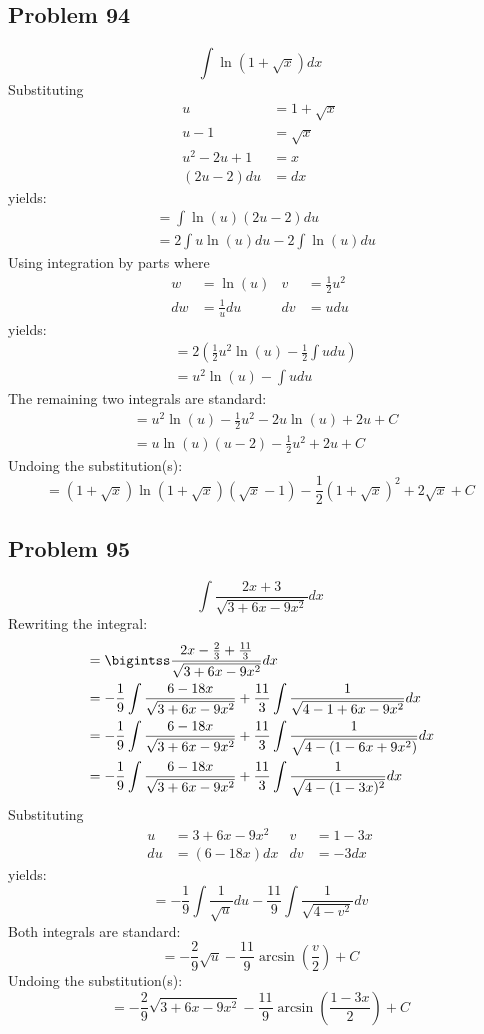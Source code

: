 \documentclass{article}
\begin{document}
\subsection*{Problem 94}
$$\int\ln\left(1+\sqrt{x}\right)dx$$
Substituting
\begin{align*}
u&=1+\sqrt{x} \\
u-1&=\sqrt{x} \\
u^2-2u+1&=x \\
(2u-2)du&=dx
\end{align*}
yields:
\begin{align*}
&=\int\ln(u)(2u-2)du \\
&=2\int u\ln(u)du-2\int\ln(u)du
\end{align*}
Using integration by parts where
\begin{align*}
w&=\ln(u) &v&=\frac{1}{2}u^2 \\
dw&=\frac{1}{u}du &dv&=udu
\end{align*}
yields:
\begin{align*}
&=2\left(\frac{1}{2}u^2\ln(u)-\frac{1}{2}\int udu\right) \\
&=u^2\ln(u)-\int udu
\end{align*}
The remaining two integrals are standard:
\begin{align*}
&=u^2\ln(u)-\frac{1}{2}u^2-2u\ln(u)+2u+C \\
&=u\ln(u)\left(u-2\right)-\frac{1}{2}u^2+2u+C
\end{align*}
Undoing the substitution(s):
$$=\left(1+\sqrt{x}\right)\ln\left(1+\sqrt{x}\right)\left(\sqrt{x}-1\right)-\frac{1}{2}\left(1+\sqrt{x}\right)^2+2\sqrt{x}+C$$
\subsection*{Problem 95}
$$\int\frac{2x+3}{\sqrt{3+6x-9x^2}}dx$$
Rewriting the integral:
\begin{align*}
&=\bigintss\frac{2x-\frac{2}{3}+\frac{11}{3}}{\sqrt{3+6x-9x^2}}dx \\
&=-\frac{1}{9}\int\frac{6-18x}{\sqrt{3+6x-9x^2}}+\frac{11}{3}\int\frac{1}{\sqrt{4-1+6x-9x^2}}dx \\
&=-\frac{1}{9}\int\frac{6-18x}{\sqrt{3+6x-9x^2}}+\frac{11}{3}\int\frac{1}{\sqrt{4-(1-6x+9x^2)}}dx \\
&=-\frac{1}{9}\int\frac{6-18x}{\sqrt{3+6x-9x^2}}+\frac{11}{3}\int\frac{1}{\sqrt{4-(1-3x)^2}}dx
\end{align*}
Substituting
\begin{align*}
u&=3+6x-9x^2 &v&=1-3x \\
du&=(6-18x)dx &dv&=-3dx
\end{align*}
yields:
$$=-\frac{1}{9}\int\frac{1}{\sqrt{u}}du-\frac{11}{9}\int\frac{1}{\sqrt{4-v^2}}dv$$
Both integrals are standard:
$$=-\frac{2}{9}\sqrt{u}-\frac{11}{9}\arcsin\left(\frac{v}{2}\right)+C$$
Undoing the substitution(s):
$$=-\frac{2}{9}\sqrt{3+6x-9x^2}-\frac{11}{9}\arcsin\left(\frac{1-3x}{2}\right)+C$$
\end{document}
